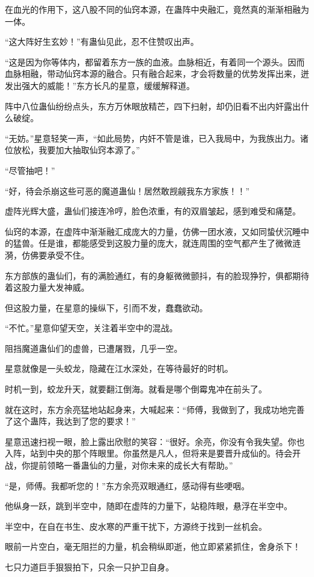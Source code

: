 \begin{this_body}
在血光的作用下，这八股不同的仙窍本源，在蛊阵中央融汇，竟然真的渐渐相融为一体。

“这大阵好生玄妙！”有蛊仙见此，忍不住赞叹出声。

“这是因为你等体内，都留着东方一族的血液。血脉相近，有着同一个源头。因而血脉相融，带动仙窍本源的融合。只有融合起来，才会将数量的优势发挥出来，迸发出强大的威能！”东方长凡的星意，缓缓解释道。

阵中八位蛊仙纷纷点头，东方万休眼放精芒，四下扫射，却仍旧看不出内奸露出什么破绽。

“无妨。”星意轻笑一声，“如此局势，内奸不管是谁，已入我局中，为我族出力。诸位放松，我要加大抽取仙窍本源了。”

“尽管抽吧！”

“好，待会杀崩这些可恶的魔道蛊仙！居然敢觊觎我东方家族！！”

虚阵光辉大盛，蛊仙们接连冷哼，脸色浓重，有的双眉皱起，感到难受和痛楚。

仙窍的本源，在虚阵中渐渐融汇成庞大的力量，仿佛一团水液，又如同蛰伏沉睡中的猛兽。任是谁，都能感受到这股力量的庞大，就连周围的空气都产生了微微涟漪，仿佛要承受不住。

东方部族的蛊仙们，有的满脸通红，有的身躯微微颤抖，有的脸现狰狞，俱都期待着这股力量大发神威。

但这股力量，在星意的操纵下，引而不发，蠢蠢欲动。

“不忙。”星意仰望天空，关注着半空中的混战。

阻挡魔道蛊仙们的虚兽，已遭屠戮，几乎一空。

星意就像是一头蛟龙，隐藏在江水深处，在等待最好的时机。

时机一到，蛟龙升天，就要翻江倒海。就看是哪个倒霉鬼冲在前头了。

就在这时，东方余亮猛地站起身来，大喊起来：“师傅，我做到了，我成功地完善了这个蛊阵，我达到了您的要求！”

星意迅速扫视一眼，脸上露出欣慰的笑容：“很好。余亮，你没有令我失望。你也入阵，站到中央的那个阵眼里。你虽然是凡人，但将来是要晋升成仙的。待会开战，你提前领略一番蛊仙的力量，对你未来的成长大有帮助。”

“是，师傅。我都听您的！”东方余亮双眼通红，感动得有些哽咽。

他纵身一跃，跳到半空中，随即在虚阵的力量下，站稳阵眼，悬浮在半空中。

半空中，在自在书生、皮水寒的严重干扰下，方源终于找到一丝机会。

眼前一片空白，毫无阻拦的力量，机会稍纵即逝，他立即紧紧抓住，舍身杀下！

七只力道巨手狠狠拍下，只余一只护卫自身。


\end{this_body}
